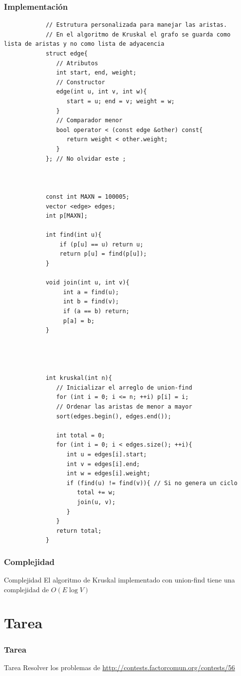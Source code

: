 \documentclass{beamer}
\begin{document}
	\begin{frame}
		\frametitle{Implementación}
		\begin{lstlisting}
			// Estrutura personalizada para manejar las aristas.
			// En el algoritmo de Kruskal el grafo se guarda como lista de aristas y no como lista de adyacencia
			struct edge{
			   // Atributos
			   int start, end, weight;
			   // Constructor
			   edge(int u, int v, int w){
			      start = u; end = v; weight = w;
			   }
			   // Comparador menor
			   bool operator < (const edge &other) const{
			      return weight < other.weight;
			   }
			}; // No olvidar este ;
			
			
			
			const int MAXN = 100005;
			vector <edge> edges;
			int p[MAXN];

			int find(int u){
			    if (p[u] == u) return u;         
			    return p[u] = find(p[u]);
			}

			void join(int u, int v){
			     int a = find(u);
			     int b = find(v);
			     if (a == b) return;
			     p[a] = b;  
			}
			
			
			
			
			int kruskal(int n){
			   // Inicializar el arreglo de union-find
			   for (int i = 0; i <= n; ++i) p[i] = i;
			   // Ordenar las aristas de menor a mayor
			   sort(edges.begin(), edges.end());
			
			   int total = 0;
			   for (int i = 0; i < edges.size(); ++i){
			      int u = edges[i].start;
			      int v = edges[i].end;
			      int w = edges[i].weight;
			      if (find(u) != find(v)){ // Si no genera un ciclo
			         total += w;
			         join(u, v);
			      }
			   }
			   return total;
			}
		\end{lstlisting}
	\end{frame}

	\begin{frame}
		\frametitle{Complejidad}
		\begin{block}{Complejidad}
			El algoritmo de Kruskal implementado con union-find tiene una complejidad de $O(E\operatorname{log} V)$
		\end{block}
	\end{frame}

	
\section{Tarea}
	\begin{frame}[fragile]
		\frametitle{Tarea}
		\begin{alertblock}{Tarea}
			Resolver los problemas de \url{http://contests.factorcomun.org/contests/56}
		\end{alertblock}
	\end{frame}
\end{document}

